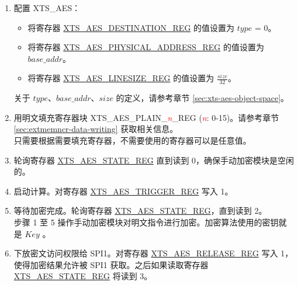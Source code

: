 \documentclass[main\_\_CN.tex]{subfiles}
\begin{document}
\begin{enumerate}

    \item 配置 XTS\_AES：
    \begin{itemize}
        \item 将寄存器 \hyperref[regdesc:XTSAESDESTINATIONREG]{XTS\_AES\_DESTINATION\_REG} 的值设置为 \begin{math}type\end{math} = 0。
        \item 将寄存器 \hyperref[regdesc:XTSAESPHYSICALADDRESSREG]{XTS\_AES\_PHYSICAL\_ADDRESS\_REG} 的值设置为 \begin{math}base\_addr\end{math}。
        \item 将寄存器 \hyperref[regdesc:XTSAESLINESIZEREG]{XTS\_AES\_LINESIZE\_REG} 的值设置为 \begin{math}\frac{size}{32}\end{math}。
    \end{itemize}
    关于 \begin{math} type \end{math}、\begin{math} base\_addr\end{math}、\begin{math}size\end{math} 的定义，请参考章节 \ref{sec:xts-aes-object-space}。
    \item 用明文填充寄存器块 XTS\_AES\_PLAIN\_\textcolor{red}{\it{n}}\_REG (\textcolor{red}{\it{n}}: 0-15)。请参考章节 \ref{sec:extmemncr-data-writing} 获取相关信息。\\只需要根据需要填充寄存器，不需要使用的寄存器可以是任意值。

    \item 轮询寄存器 \hyperref[regdesc:XTSAESSTATEREG]{XTS\_AES\_STATE\_REG} 直到读到 0，确保手动加密模块是空闲的。

    \item 启动计算。对寄存器 \hyperref[regdesc:XTSAESTRIGGERREG]{XTS\_AES\_TRIGGER\_REG} 写入 1。

    \item 等待加密完成。轮询寄存器 \hyperref[regdesc:XTSAESSTATEREG]{XTS\_AES\_STATE\_REG}，直到读到 2。\\
    步骤 1 至 5 操作手动加密模块对明文指令进行加密。加密算法使用的密钥就是  \begin{math}Key\end{math} 。

    \item 下放密文访问权限给 SPI1。对寄存器 \hyperref[regdesc:XTSAESRELEASEREG]{XTS\_AES\_RELEASE\_REG} 写入 1，使得加密结果允许被 SPI1 获取。之后如果读取寄存器 \hyperref[regdesc:XTSAESSTATEREG]{XTS\_AES\_STATE\_REG} 将读到 3。


\end{enumerate}
\end{document}
